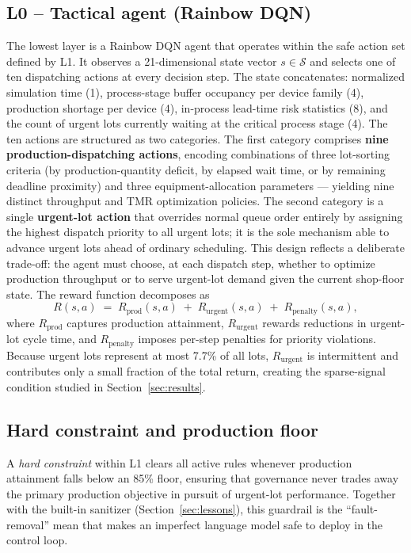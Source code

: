 \documentclass[10pt]{article}
\begin{document}
\subsection{L0 -- Tactical agent (Rainbow DQN)}
The lowest layer is a Rainbow DQN agent \parencite{hessel2018} that operates within
the safe action set defined by L1. It observes a 21-dimensional state vector
$s \in \mathcal{S}$ and selects one of ten dispatching actions at every decision
step. The state concatenates: normalized simulation time (1), process-stage buffer
occupancy per device family (4), production shortage per device (4), in-process
lead-time risk statistics (8), and the count of urgent lots currently waiting at
the critical process stage (4). The ten actions are structured as two categories.
The first category comprises \textbf{nine production-dispatching actions}, encoding combinations of three lot-sorting criteria (by production-quantity deficit, by elapsed wait time, or by remaining deadline proximity) and three equipment-allocation parameters — yielding nine distinct throughput and TMR optimization policies.
The second category is a single \textbf{urgent-lot action} that overrides normal queue order entirely by assigning the highest dispatch priority to all urgent lots; it is the sole mechanism able to advance urgent lots ahead of ordinary scheduling.
This design reflects a deliberate trade-off: the agent must choose, at each dispatch step, whether to optimize production throughput or to serve urgent-lot demand given the current shop-floor state.
The reward function decomposes as
\begin{equation}
  R(s,a) \;=\; R_{\text{prod}}(s,a) \;+\; R_{\text{urgent}}(s,a) \;+\; R_{\text{penalty}}(s,a),
  \label{eq:reward}
\end{equation}
where $R_{\text{prod}}$ captures production attainment, $R_{\text{urgent}}$
rewards reductions in urgent-lot cycle time, and $R_{\text{penalty}}$ imposes
per-step penalties for priority violations. Because urgent lots represent at most
7.7\% of all lots, $R_{\text{urgent}}$ is intermittent and contributes only a
small fraction of the total return, creating the sparse-signal condition studied
in Section~\ref{sec:results}.

\subsection{Hard constraint and production floor}
A \emph{hard constraint} within L1 clears all active rules whenever production
attainment falls below an 85\% floor, ensuring that governance never trades away
the primary production objective in pursuit of urgent-lot performance.
Together with the built-in sanitizer (Section~\ref{sec:lessons}), this guardrail
is the ``fault-removal'' mean that makes an imperfect language model safe to
deploy in the control loop.
\end{document}
